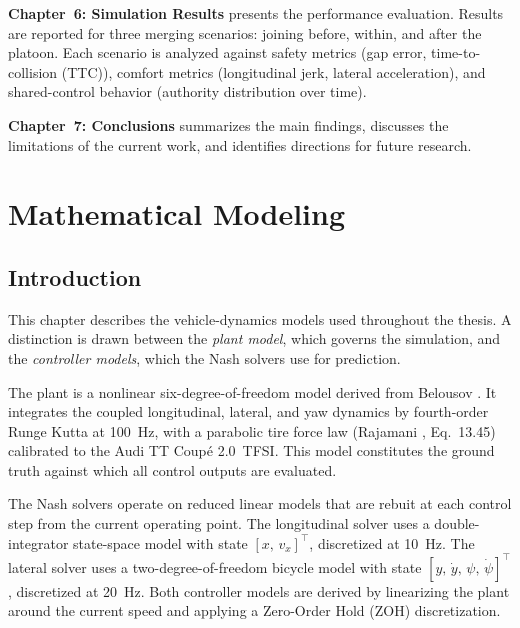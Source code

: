 \documentclass[12pt,a4paper,oneside]{report}
\begin{document}
\textbf{Chapter~6: Simulation Results} presents the performance evaluation. Results
are reported for three merging scenarios: joining before, within, and after the
platoon. Each scenario is analyzed against safety metrics (gap error, time-to-collision (TTC)),
comfort metrics (longitudinal jerk, lateral acceleration), and shared-control
behavior (authority distribution over time).

\textbf{Chapter~7: Conclusions} summarizes the main findings, discusses the
limitations of the current work, and identifies directions for future research.



\chapter{Mathematical Modeling}

\section{Introduction}

This chapter describes the vehicle-dynamics models used throughout the thesis. A distinction is drawn between the \emph{plant model}, which governs the simulation, and the \emph{controller models}, which the Nash solvers use for prediction.

The plant is a nonlinear six-degree-of-freedom model derived from Belousov
\cite{belousovDevelopmentVehicleSimulation}. It integrates the coupled longitudinal, lateral, and yaw dynamics by fourth-order Runge Kutta at \SI{100}{Hz}, with a
parabolic tire force law (Rajamani \cite{rajamaniVehicleDynamicsControl2005},
Eq.~13.45) calibrated to the Audi TT Coup\'{e} 2.0~TFSI. This model constitutes the
ground truth against which all control outputs are evaluated.

The Nash solvers operate on reduced linear models that are rebuit at each control step
from the current operating point. The longitudinal solver uses a double-integrator
state-space model with state $[x,\, v_x]^\top$, discretized at \SI{10}{Hz}. The
lateral solver uses a two-degree-of-freedom bicycle model with state
$[y,\, \dot{y},\, \psi,\, \dot{\psi}]^\top$, discretized at \SI{20}{Hz}. Both
controller models are derived by linearizing the plant around the current speed and
applying a Zero-Order Hold (ZOH) discretization.
\end{document}
